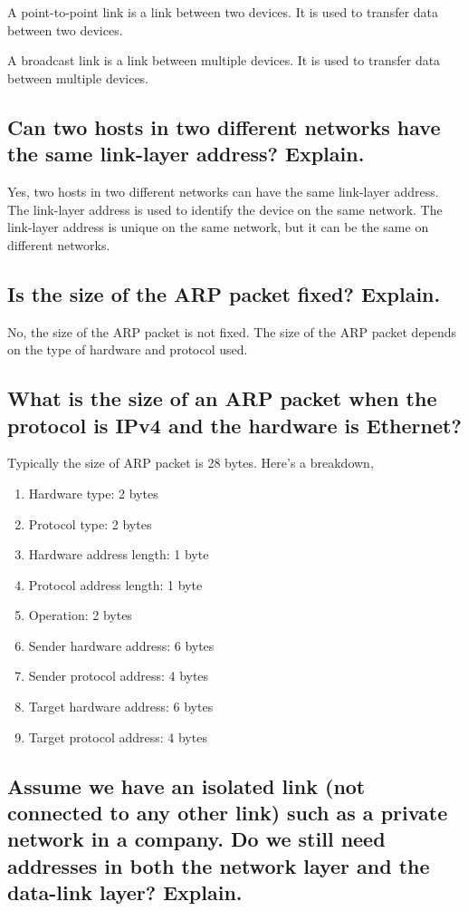 \documentclass{article}
\begin{document}
A point-to-point link is a link between two devices. It is used to transfer data between two devices.

A broadcast link is a link between multiple devices. It is used to transfer data between multiple devices.

\subsection{
	Can two hosts in two different networks have the same link-layer address?
	Explain.
}

Yes, two hosts in two different networks can have the same link-layer address. The link-layer address is used to identify the device on the same network. The link-layer address is unique on the same network, but it can be the same on different networks.

\subsection{
	Is the size of the ARP packet fixed? Explain.
}

No, the size of the ARP packet is not fixed. The size of the ARP packet depends on the type of hardware and protocol used.

\subsection{
	What is the size of an ARP packet when the protocol is IPv4 and the hardware
	is Ethernet?
}

Typically the size of ARP packet is 28 bytes. Here's a breakdown,

\begin{enumerate}
	\item Hardware type: 2 bytes
	\item Protocol type: 2 bytes
	\item Hardware address length: 1 byte
	\item Protocol address length: 1 byte
	\item Operation: 2 bytes
	\item Sender hardware address: 6 bytes
	\item Sender protocol address: 4 bytes
	\item Target hardware address: 6 bytes
	\item Target protocol address: 4 bytes
\end{enumerate}

\subsection{
	Assume we have an isolated link (not connected to any other link) such as a
	private network in a company. Do we still need addresses in both the network
	layer and the data-link layer? Explain.
}
\end{document}
